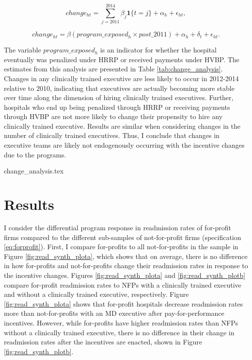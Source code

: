 \documentclass[12pt]{article}
\begin{document}
    \begin{equation}\label{eq:change1}
    change_{ht} = \sum_{j=2011}^{2014}\beta_j\mathbf{1}\{t=j\} + \alpha_h + \epsilon_{ht},
    \end{equation}

    \begin{equation}\label{eq:change2}
    change_{ht} = \beta(program\_exposed_{h} \times post\_2011)+ \alpha_h + \delta_t + \epsilon_{ht}.
    \end{equation}

    The variable $program\_exposed_{h}$ is an indicator for whether the hospital eventually was penalized under HRRP or received payments under HVBP. The estimates from this analysis are presented in Table \ref{tab:change_analysis}. Changes in any clinically trained executive are less likely to occur in 2012-2014 relative to 2010, indicating that executives are actually becoming more stable over time along the dimension of hiring clinically trained executives. Further, hospitals who end up being penalized through HRRP or receiving payments through HVBP are not more likely to change their propensity to hire any clinically trained executive. Results are similar when considering changes in the number of clinically trained executives. Thus, I conclude that changes in executive teams are likely not endogenously occurring with the incentive changes due to the programs. 

     {change_analysis.tex}

    

    
    
    \section{Results}

     I consider the differential program response in readmission rates of for-profit firms compared to the different sub-samples of not-for-profit firms (specification \ref{eq:forprofit}). First, I compare for-profits to all not-for-profits in the sample in Figure \ref{fig:read_synth_plota}, which shows that on average, there is no difference in how for-profits and not-for-profits change their readmission rates in response to the incentive changes. Figures \ref{fig:read_synth_plota} and \ref{fig:read_synth_plotb} compare for-profit readmission rates to NFPs with a clinically trained executive and without a clinically trained executive, respectively. Figure \ref{fig:read_synth_plota} shows that for-profit hospitals decrease readmission rates more than not-for-profits with an MD executive after pay-for-performance incentives. However, while for-profits have higher readmission rates than NFPs without a clinically trained executive, there is no difference in their change in readmission rates after the incentives are enacted, shown in Figure \ref{fig:read_synth_plotb}. 
\end{document}
